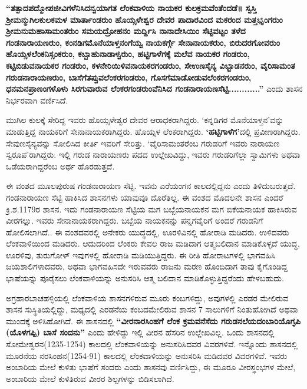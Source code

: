 \textbf{“ತತ್ಪಾದಪದ್ಮೋಪಜೀವಿಗಳೆನಿಸಿದನ್ವಯಾಗತ ಲೆಂಕವಾಳಿಯ ನಾಯಕರ ಕುಲಕ್ರಮವೆಂತೆಂದಡೆ॥ ಸ್ವಸ್ತಿ\general{\break } ಶ‍್ರೀಮನ್ಮುಗಿಲಕುಲಕಮಳ ಮಾರ್ತಾಂಡರುಂ ಹೊಯ್ಸಳೇಶ್ವರ ದೇವರ ಪಾದಾರವಿಂದ ಮಕರಂದ ಮತ್ತಭೃಂಗರುಂ\general{\break } ಶ‍್ರೀಮನುಮಹಾಸಾಮಂತರುಂ ಸಮಯದ್ರೋಹನಂ ಮರ್ದ್ದಿಸಿ ನಾನಾದೇಸಿಯಿಂ ಸೆಟ್ಟಿವಟ್ಟಂ ತಳೆದ ಗಂಡನಾರಾಯಣರುಂ, ಕಂನಡಿಗಮೊನೆಯಾಳ್ತನಂಗೆಯ್ವ ನಾಯಕರ್ಗ್ಗೆ ಸೇನಾನಾಯಕರುಂ, ಬಿರುದರಗೋವರುಂ ಹೊಯ್ಸಳಲೆಂಕನಿಸ್ಸಂಕರುಂ,\general{\break } ಕಬ್ಬಾಹುನಾಡಾಳ್ವರುಂ, ಹಟ್ಟಿಗಾಳೆಗಕ್ಕೆ ಮಲೆವ ನಾಯಕರ ಗಂಡರುಂ, ಕಟ್ಟಿಬಿಡುವನಾಯಕರ ಗಂಡರುಂ,\general{\break } ಕಳನೇರಿಯಿಳಿವನಾಯಕರಗಂಡರುಂ, ಸೇಉಣಸೈನ್ಯ ವಿಭ್ಬಾಡನರುಂ, ವೈರಿಸಾಮಂತ ಗರುಡನಾರಾಯಣರುಂ,\general{\break } ಬಾಸೆಗೆತಪ್ಪುವಲೆಂಕರಗಂಡರುಂ, ಗೊಸಗೆಮಾಡೋಡುವಲೆಂಕರಗಂಡರುಂ, ಧನಮನಪ್ರಾಣಂಗಳೊಳು ಸಿರಗುವಾರುವ\general{\break } ಲೆಂಕರಗಂಡರುಂವೆನಿಸಿದ ಗಂಡನಾರಾಯಣಸೆಟ್ಟಿ............”} ಎಂದು ಶಾಸನ ನಿರ್ಭರವಾಗಿ ವರ್ಣಿಸಿದೆ.

ಮುಗಿಲ ಕುಲಕ್ಕೆ ಸೇರಿದ್ದ ಇವರು ಹೊಯ್ಸಳೇಶ್ವರ ದೇವರ ಆರಾಧಕರಾಗಿದ್ದರು. ‘ಕನ್ನಡಿಗರ ಮೊನೆಯಾಳ್ತನ’ವನ್ನು ಮಾಡುತ್ತಿದ್ದ ನಾಯಕರಿಗೆ ಸೇನಾನಾಯಕರಾಗಿದ್ದರು. ಹೊಯ್ಸಳ ಲೆಂಕರಾಗಿದ್ದರು. \textbf{‘ಹಟ್ಟಿಗಾಳೆಗ’}ದಲ್ಲಿ ಪ್ರವೀಣರಾಗಿದ್ದರು. ಸೇವುಣಸೈನ್ಯವನ್ನು ಸೋಲಿಸಿದ ಕೀರ್ತಿ ಇವರಿಗೆ ಸೇರಿತ್ತು. ‘ವೈರಿಸಾಮಂತರೆಂಬ ಗರುಡರಿಗೆ ಇವರು ನಾರಾಯಣ ಸ್ವರೂಪ’ರಾಗಿದ್ದರು. ಇಲ್ಲಿ ಗರುಡ ನಾರಾಯಣರು ಪದದ ಉಲ್ಲೇಖವಿದ್ದು, ಇವರು ಗರುಡರಿಗೆಲ್ಲಾ ಸ್ವಾಮಿಗಳು ಅಥವಾ ಒಡೆಯರಾಗಿದ್ದರೆಂಬ ಅರ್ಥ ಹೊರಡುತ್ತದೆ.

ಈ ವಂಶದ ಮೂಲಪುರುಷ ಗಂಡನಾರಾಯಣ ಸೆಟ್ಟಿ. ಇವನು ಎರೆಯಂಗನ ಕಾಲದಲ್ಲಿದ್ದನು ಎಂದು ತಿಳಿದುಬರು\-ತ್ತದೆ. ಗಂಡನಾರಾಯಣ ಸೆಟ್ಟಿ ಹಾಕಿಸಿದ ಶಾಸನಗಳು ಯಾವುವೂ ದೊರೆತಿಲ್ಲ. ಈ ವಂಶದ ಮೊದಲನೇ ಶಾಸನ ಎಂದರೆ ಕ್ರಿ.ಶ.1179ರ ಶಾಸನ. ಇದು ಗಂಡನಾರಾಯಣ ಸೆಟ್ಟಿಯ ಮಗ ಬಬ್ಬೆಯನಾಯಕನ ಮಗ ಬಿಕೆಯನಾಯಕ ಹಾಕಿಸಿರುವ ವೀರಗಲ್ಲು. ಇವರು ಸೇನಾನಾಯಕರಾಗಿದ್ದರು. ಬಬ್ಬೆಯ ನಾಯಕನನ್ನು ಪನ್ನಗವೈರಿಗೆ ಅಂದರೆ ಗರುಡನಿಗೆ ಹೋಲಿಸಲಾಗಿದೆ.. ಈ ವಂಶದವರಲ್ಲಿ ಅನೇಕರು ಯುದ್ಧದಲ್ಲಿ, ಊರಳಿವಿನಲ್ಲಿ ಹೋರಾಡಿ ಮಡಿದರು. ಉಳಿದವರು ಲೆಂಕವಾಳಿಯಿಂದ ಮಡಿದರು. ಆದುದರಿಂದ ಲೆಂಕರು ಕೇವಲ ರಾಜ ಮಡಿದಾಗ ಆತ್ಮಬಲಿದಾನ ಮಾಡಿಕೊಳ್ಳದೆ ಯುದ್ಧ, ಊರಳಿವು, ತುರುಗೋಳ್​ ಇವುಗಳಲ್ಲಿ ಹೋರಾಡಿ ಮಡಿಯುತ್ತಿದ್ದರು. ಈ ರೀತಿ ಹೋರಾಟಗಳಲ್ಲಿ ಭಾಗವಹಿಸಿ ಜಯಶಾಲಿಗಳಾದವರು, ಅಥವಾ ಭಾಗವಹಿಸದೇ ಇರುವವರು ರಾಜನು ಮರಣ ಹೊಂದಿದಾಗ ತಾವು ಕೈಗೊಂಡಿದ್ದ ಭಾಷೆಯನ್ನು ಪೂರೈಸಲು ಲೆಂಕವಾಳಿಯನ್ನು ಅನುಸರಿಸಿ ಆತ್ಮ ಬಲಿದಾನ ಮಾಡಿಕೊಳ್ಳುತ್ತಿದ್ದರೆಂದು ಹೇಳಬಹುದು.

ಅಗ್ರಹಾರಬಾಚಹಳ್ಳಿಯಲ್ಲಿ ಲೆಂಕವಾಳಿಯ ಶಾಸನಗಳಿರುವ ಮೂರು ಕಂಬಗಳಿದ್ದು, ಅವುಗಳಲ್ಲಿ ಎರಡರ ಮೇಲಿರುವ ಶಾಸನ ಸುಸ್ಥಿತಿಯಲ್ಲಿದ್ದು, ಮಧ್ಯದಲ್ಲಿ ಎರಡನೆಯ ಕಂಬದಮೇಲಿರುವ ಶಾಸನ 7 ಸಾಲುಗಳಿಗೆ ನಿಂತುಹೋಗಿದೆ ಅಥವಾ ಮುಂದಕ್ಕೆ ಅಳಿಸಿಹೋಗಿದೆ. ಈ ಶಾಸನದಲ್ಲಿ \textbf{“ವೀರನಾರಸಿಂಹಗೆ ಲೆಂಕ ಕ್ರಮವನೆಸೆದು ಗರುಡನಲೆಯದಂಬಾರಿಯೊಗ್ಳಪಿ (ಯೊಳಗಪ್ಪಿ) ಬಾಸೆ ಸಂದನು”} ಎಂದು ಹೇಳಿದ್ದು ಇಲ್ಲಿ ವೀರನ ಹೆಸರಿನ ಉಲ್ಲೇಖವಿಲ್ಲ. ಒಂದು ಶಾಸನದಲ್ಲಿ ಸೋಮೇಶ್ವರನ\break (1235-1254) ಕಾಲದಲ್ಲಿ ಲೆಂಕವಾಳಿಯನ್ನು ಅನುಸರಿಸಿದವರ ವಿವರಗಳಿವೆ. ಇನ್ನೊಂದು ಶಾಸನದಲ್ಲಿ ಮೂರನೆಯ ನರಸಿಂಹನ(1254-91) ಕಾಲದಲ್ಲಿ ಲೆಂಕವಾಳಿಯನ್ನು ಅನುಸರಿಸಿ ಮಡಿದವರ ವಿವರಗಳಿವೆ. ಇವರು ಅಂಬಾರಿಯ ಮೇಲೆ ಕುಳಿತು ಭಾಷೆಗೆ ಸಂದರು ಎಂದು ಶಾಸನವು ವರ್ಣಿಸಿದ್ದು, ಈ ಮೂರೂ ವೀರಸ್ಥಂಭಗಳ ಮೇಲೆ, ಅಂಬಾರಿಯ ಮೇಲೆ ಕುಳಿತಿರುವ ವೀರರ ಶಿಲ್ಪಗಳನ್ನು ಬಿಡಿಸಲಾಗಿದೆ.

